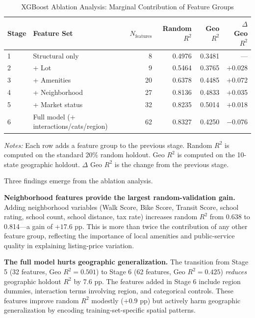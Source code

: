 \begin{table}[H]
\centering
\caption{XGBoost Ablation Analysis: Marginal Contribution of Feature Groups}
\label{tab:ablation}
\begin{threeparttable}
\small
\begin{tabular}{llrrrr}
\toprule
Stage & Feature Set & $N_{\text{features}}$ & Random $R^2$ & Geo $R^2$ & $\Delta$ Geo $R^2$ \\
\midrule
1 & Structural only & 8 & 0.4976 & 0.3481 & --- \\
2 & + Lot & 9 & 0.5464 & 0.3765 & $+$0.028 \\
3 & + Amenities & 20 & 0.6378 & 0.4485 & $+$0.072 \\
4 & + Neighborhood & 27 & 0.8136 & 0.4833 & $+$0.035 \\
5 & + Market status & 32 & 0.8235 & 0.5014 & $+$0.018 \\
6 & Full model (+ interactions/cats/region) & 62 & 0.8327 & 0.4250 & $-$0.076 \\
\bottomrule
\end{tabular}
\begin{tablenotes}
\small
\item \textit{Notes:} Each row adds a feature group to the previous stage. Random $R^2$ is computed on the standard 20\% random holdout. Geo $R^2$ is computed on the 10-state geographic holdout. $\Delta$ Geo $R^2$ is the change from the previous stage.
\end{tablenotes}
\end{threeparttable}
\end{table}

Three findings emerge from the ablation analysis.

\textbf{Neighborhood features provide the largest random-validation gain.} Adding neighborhood variables (Walk Score, Bike Score, Transit Score, school rating, school count, school distance, tax rate) increases random $R^2$ from 0.638 to 0.814---a gain of $+17.6$ pp. This is more than twice the contribution of any other feature group, reflecting the importance of local amenities and public-service quality in explaining listing-price variation.

\textbf{The full model hurts geographic generalization.} The transition from Stage 5 (32 features, Geo $R^2 = 0.501$) to Stage 6 (62 features, Geo $R^2 = 0.425$) \emph{reduces} geographic holdout $R^2$ by 7.6 pp. The features added in Stage 6 include region dummies, interaction terms involving region, and categorical controls. These features improve random $R^2$ modestly ($+0.9$ pp) but actively harm geographic generalization by encoding training-set-specific spatial patterns.

